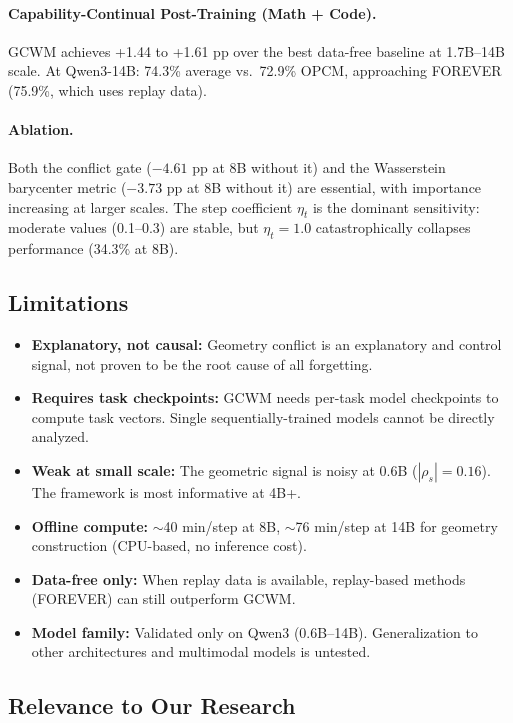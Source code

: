 \documentclass[11pt]{article}
\begin{document}
\paragraph{Capability-Continual Post-Training (Math + Code).}
GCWM achieves +1.44 to +1.61 pp over the best data-free baseline at 1.7B--14B scale. At Qwen3-14B: 74.3\% average vs.\ 72.9\% OPCM, approaching FOREVER (75.9\%, which uses replay data).

\paragraph{Ablation.}
Both the conflict gate ($-4.61$ pp at 8B without it) and the Wasserstein barycenter metric ($-3.73$ pp at 8B without it) are essential, with importance increasing at larger scales. The step coefficient $\eta_t$ is the dominant sensitivity: moderate values (0.1--0.3) are stable, but $\eta_t = 1.0$ catastrophically collapses performance (34.3\% at 8B).

\subsection{Limitations}

\begin{itemize}
    \item \textbf{Explanatory, not causal:} Geometry conflict is an explanatory and control signal, not proven to be the root cause of all forgetting.
    \item \textbf{Requires task checkpoints:} GCWM needs per-task model checkpoints to compute task vectors. Single sequentially-trained models cannot be directly analyzed.
    \item \textbf{Weak at small scale:} The geometric signal is noisy at 0.6B ($|\rho_s| = 0.16$). The framework is most informative at 4B+.
    \item \textbf{Offline compute:} $\sim$40 min/step at 8B, $\sim$76 min/step at 14B for geometry construction (CPU-based, no inference cost).
    \item \textbf{Data-free only:} When replay data is available, replay-based methods (FOREVER) can still outperform GCWM.
    \item \textbf{Model family:} Validated only on Qwen3 (0.6B--14B). Generalization to other architectures and multimodal models is untested.
\end{itemize}

\subsection{Relevance to Our Research}
\end{document}
